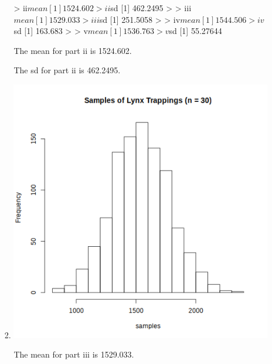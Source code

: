 \documentclass[12pt,letterpaper]{article}
\begin{document}
\begin{enumerate}
\begin{enumerate}
\begin{enumerate}
              > ii$mean
              [1] 1524.602
              > ii$sd
              [1] 462.2495
              >
              > iii$mean
              [1] 1529.033
              > iii$sd
              [1] 251.5058
              >
              > iv$mean
              [1] 1544.506
              > iv$sd
              [1] 163.683
              >
              > v$mean
              [1] 1536.763
              > v$sd
              [1] 55.27644

              The mean for part ii is \num{1524.602}.

              The sd for part ii is \num{462.2495}.
            \item
              \includegraphics[width=\linewidth]{prob3b_iii.png}

              The mean for part iii is \num{1529.033}.


\end{enumerate}
\end{enumerate}
\end{enumerate}
\end{document}
